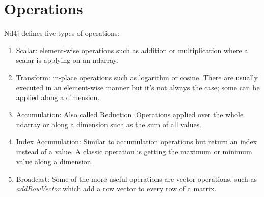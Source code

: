 \section{Operations}

Nd4j defines five types of operations:
\begin{enumerate}
\item Scalar: element-wise operations such as addition or multiplication where a scalar is applying on an ndarray.
\item Transform: in-place operations such as logarithm or cosine. There are usually executed in an element-wise manner but it's not always the case; some can be applied along a dimension.
\item Accumulation: Also called Reduction. Operations applied over the whole ndarray or along a dimension such as the sum of all values.
\item Index Accumulation: Similar to accumulation operations but return an index instead of a value. A classic operation is getting the maximum or minimum value along a dimension.
\item Broadcast: Some of the more useful operations are vector operations, such as \textit{addRowVector} which add a row vector to every row of a matrix.
\end{enumerate}


